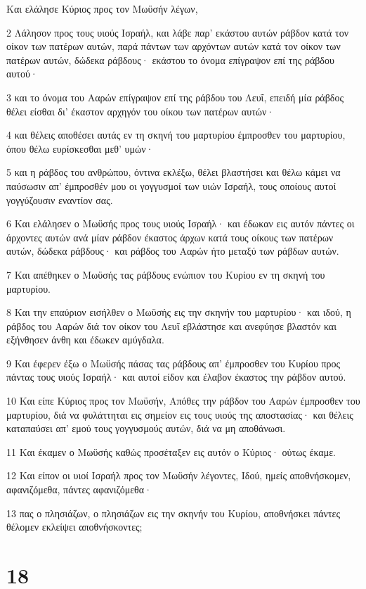 \par Και ελάλησε Κύριος προς τον Μωϋσήν λέγων,
\par 2 Λάλησον προς τους υιούς Ισραήλ, και λάβε παρ' εκάστου αυτών ράβδον κατά τον οίκον των πατέρων αυτών, παρά πάντων των αρχόντων αυτών κατά τον οίκον των πατέρων αυτών, δώδεκα ράβδους· εκάστου το όνομα επίγραψον επί της ράβδου αυτού·
\par 3 και το όνομα του Ααρών επίγραψον επί της ράβδου του Λευΐ, επειδή μία ράβδος θέλει είσθαι δι' έκαστον αρχηγόν του οίκου των πατέρων αυτών·
\par 4 και θέλεις αποθέσει αυτάς εν τη σκηνή του μαρτυρίου έμπροσθεν του μαρτυρίου, όπου θέλω ευρίσκεσθαι μεθ' υμών·
\par 5 και η ράβδος του ανθρώπου, όντινα εκλέξω, θέλει βλαστήσει και θέλω κάμει να παύσωσιν απ' έμπροσθέν μου οι γογγυσμοί των υιών Ισραήλ, τους οποίους αυτοί γογγύζουσιν εναντίον σας.
\par 6 Και ελάλησεν ο Μωϋσής προς τους υιούς Ισραήλ· και έδωκαν εις αυτόν πάντες οι άρχοντες αυτών ανά μίαν ράβδον έκαστος άρχων κατά τους οίκους των πατέρων αυτών, δώδεκα ράβδους· και ράβδος του Ααρών ήτο μεταξύ των ράβδων αυτών.
\par 7 Και απέθηκεν ο Μωϋσής τας ράβδους ενώπιον του Κυρίου εν τη σκηνή του μαρτυρίου.
\par 8 Και την επαύριον εισήλθεν ο Μωϋσής εις την σκηνήν του μαρτυρίου· και ιδού, η ράβδος του Ααρών διά τον οίκον του Λευΐ εβλάστησε και ανεφύησε βλαστόν και εξήνθησεν άνθη και έδωκεν αμύγδαλα.
\par 9 Και έφερεν έξω ο Μωϋσής πάσας τας ράβδους απ' έμπροσθεν του Κυρίου προς πάντας τους υιούς Ισραήλ· και αυτοί είδον και έλαβον έκαστος την ράβδον αυτού.
\par 10 Και είπε Κύριος προς τον Μωϋσήν, Απόθες την ράβδον του Ααρών έμπροσθεν του μαρτυρίου, διά να φυλάττηται εις σημείον εις τους υιούς της αποστασίας· και θέλεις καταπαύσει απ' εμού τους γογγυσμούς αυτών, διά να μη αποθάνωσι.
\par 11 Και έκαμεν ο Μωϋσής καθώς προσέταξεν εις αυτόν ο Κύριος· ούτως έκαμε.
\par 12 Και είπον οι υιοί Ισραήλ προς τον Μωϋσήν λέγοντες, Ιδού, ημείς αποθνήσκομεν, αφανιζόμεθα, πάντες αφανιζόμεθα·
\par 13 πας ο πλησιάζων, ο πλησιάζων εις την σκηνήν του Κυρίου, αποθνήσκει πάντες θέλομεν εκλείψει αποθνήσκοντες;

\chapter{18}

